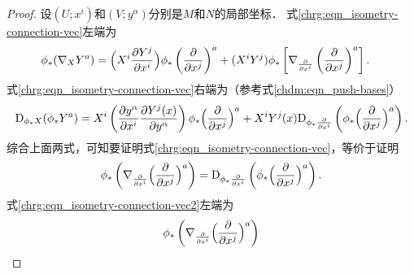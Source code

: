 \begin{proof}
    设$(U;x^i)$和$(V;y^\alpha)$分别是$M$和$N$的局部坐标．
    式\eqref{chrg:eqn_isometry-connection-vec}左端为
    \begin{align*}
    \phi_{*} (\nabla _X Y^a) %
     &=  \Bigl( X^i \frac{\partial Y^j}{\partial x^i} \Bigr)
\phi_{*}\left(\frac{\partial} {\partial x^j}\right)^a
+ ( X^i Y^j ) \phi_{*}\left[ \nabla _{\frac{\partial}{\partial x^i}}
\left(\frac{\partial} {\partial x^j}\right)^a\right] .
    \end{align*}
    式\eqref{chrg:eqn_isometry-connection-vec}右端为（参考式\eqref{chdm:eqn_push-bases}）
    \begin{align*}
    {\rm D}_ {\phi_* X} ({\phi_*}Y^a) = %
     X^i \left( \frac{\partial y^\alpha}{\partial x^i}
     \frac{\partial Y^j(x)}{\partial y^\alpha} \right)
    {\phi_*}\Bigl(\frac{\partial} {\partial x^j}\Bigr)^a
    +X^i  Y^j(x)  {\rm D}_ {\phi_* \frac{\partial}{\partial x^i}}
    \left({\phi_*}\Bigl(\frac{\partial} {\partial x^j}\Bigr)^a \right) .
    \end{align*}
    综合上面两式，可知要证明式\eqref{chrg:eqn_isometry-connection-vec}，等价于证明
    \begin{equation}\label{chrg:eqn_isometry-connection-vec2}
      \phi_{*}\left( \nabla _{\frac{\partial}{\partial x^i}}
      \Bigl(\frac{\partial} {\partial x^j}\Bigr)^a\right)
      ={\rm D}_ {\phi_* \frac{\partial}{\partial x^i}}
      \left({\phi_*}\Bigl(\frac{\partial} {\partial x^j}\Bigr)^a \right) .
    \end{equation}
    式\eqref{chrg:eqn_isometry-connection-vec2}左端为
    \begin{equation*}
       \phi_{*}\left( \nabla _{\frac{\partial}{\partial x^i}}\Bigl(\frac{\partial} {\partial x^j}\Bigr)^a\right)

\end{equation*}
\end{proof}
